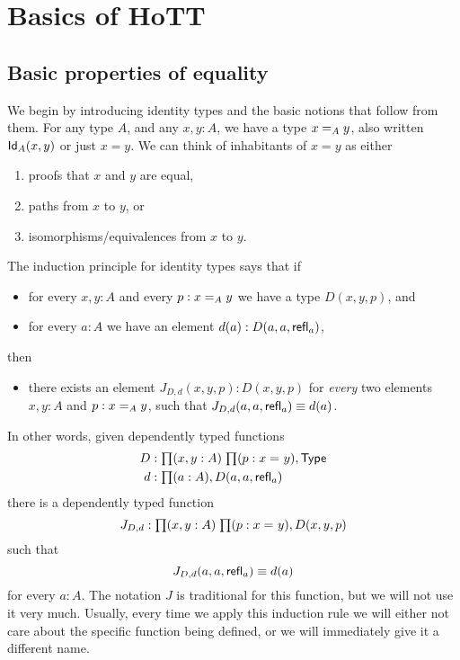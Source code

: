 \chapter{Basics of HoTT}
\label{cha:basics}

\section{Basic properties of equality}
\label{sec:equality}


We begin by introducing identity types and the basic notions that follow from them.
For any type $A$, and any $x,y:A$, we have a type $\id[A]{x}{y}$, also written $\idtype[A]{x}{y}$ or just $x=y$.
We can think of inhabitants of $x=y$ as either
\begin{enumerate}
\item proofs that $x$ and $y$ are equal,
\item paths from $x$ to $y$, or
\item isomorphisms/equivalences from $x$ to $y$.
\end{enumerate}
The induction principle for identity types says that if
\begin{itemize}
\item for every $x,y:A$ and every $p:\id[A]xy$ we have a type $D(x,y,p)$, and
\item for every $a:A$ we have an element $d(a):D(a,a,\refl a)$, 
\end{itemize}
then
\begin{itemize}
\item there exists an element $J_{D,d}(x,y,p):D(x,y,p)$ for \emph{every} two elements $x,y:A$ and $p:\id[A]xy$, such that $J_{D,d}(a,a,\refl a) \jdeq d(a)$.
\end{itemize}
In other words, given dependently typed functions
\begin{align*}
D & :\prd{x,y:A}{p:\id{x}{y}} \type\\
d & :\prd{a:A} D(a,a,\refl{a})
\end{align*}
there is a dependently typed function
\[J_{D,d}:\prd{x,y:A}{p:\id{x}{y}} D(x,y,p)\]
such that 
\begin{equation}\label{eq:Jconv}
J_{D,d}(a,a,\refl{a})\jdeq d(a)
\end{equation}
for every $a:A$.
The notation $J$ is traditional for this function, but we will not use it very much.
Usually, every time we apply this induction rule we will either not care about the specific function being defined, or we will immediately give it a different name.

